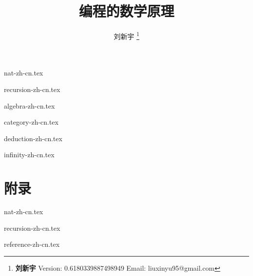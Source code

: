 \documentclass[UTF8, a4paper,twoside]{book} %
\begin{document}


\title{{\bf \Huge 编程的数学原理}
  \centering
            }

\author{刘新宇
  \thanks{{\bfseries 刘新宇} \newline
    Version: 0.6180339887498949 \newline
    Email: liuxinyu95@gmail.com \newline
    }}

\maketitle


\tableofcontents
\newpage

{nat-zh-cn.tex}

{recursion-zh-cn.tex}

{algebra-zh-cn.tex}

{category-zh-cn.tex}

{deduction-zh-cn.tex}

{infinity-zh-cn.tex}

\part{附录}
\appendix
\noappendicestocpagenum
\addappheadtotoc

{nat-zh-cn.tex}

{recursion-zh-cn.tex}

{reference-zh-cn.tex}

%

\printindex
\end{document}
